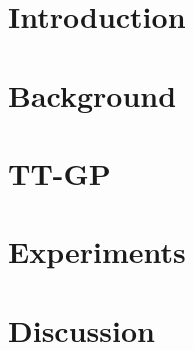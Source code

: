 \documentclass[twoside]{article}
\begin{document}
\section{Introduction}
  

\section {Background}
  

\section{TT-GP}
  

\section{Experiments}
  


\section{Discussion}
  




\end{document}
